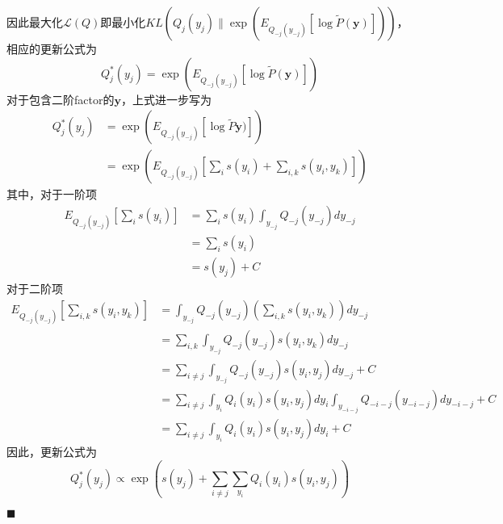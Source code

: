 因此最大化$\mathcal{L}(Q)$即最小化$KL\left(Q_j(y_j)\|\exp\left(E_{Q_{-j}(y_{-j})}\left[\log \tilde{P}(\boldsymbol{y}) \right]\right)\right)$，相应的更新公式为
\begin{equation}
  {Q^{\ast}_j(y_j)}=\exp\left(E_{Q_{-j}(y_{-j})}\left[\log \tilde{P}(\boldsymbol{y}) \right]\right)
\end{equation}
对于包含二阶factor的$\boldsymbol{y}$，上式进一步写为
\begin{equation}
  \begin{split}
    {Q^{\ast}_j(y_j)}&=\exp\left(E_{Q_{-j}(y_{-j})}\left[\log \tilde{P}\boldsymbol{y})\right]\right)\\
    &=\exp\left(E_{Q_{-j}(y_{-j})}\left[\sum_i s(y_i)+\sum_{i,k} s(y_i,y_k) \right]\right)
  \end{split}
\end{equation}
其中，对于一阶项
\begin{equation}
  \begin{split}
    E_{Q_{-j}(y_{-j})}\left[\sum_i s(y_i)\right]
    &=\sum_{i}s(y_i) \int_{y_{-j}} Q_{-j}(y_{-j}) dy_{-j}\\
    &=\sum_{i}s(y_i)\\
    &=s(y_j)+C
  \end{split}
\end{equation}
对于二阶项
\begin{equation}
  \begin{split}
    E_{Q_{-j}(y_{-j})}\left[\sum_{i,k} s(y_i,y_k) \right] &=\int_{y_{-j}} Q_{-j}(y_{-j})\left(\sum_{i,k} s(y_i,y_k) \right) dy_{-j}\\
    &=\sum_{i,k}\int_{y_{-j}} Q_{-j}(y_{-j})s(y_i,y_k) dy_{-j}\\
    &=\sum_{i\neq j}{\int_{y_{-j}}Q_{-j}(y_{-j}) s(y_i,y_j)  dy_{-j}} +C\\
    &=\sum_{i\neq j}{\int_{y_i}Q_{i}(y_i) s(y_i,y_j)  dy_i}{\int_{y_{-i-j}}Q_{{-i-j}}(y_{-i-j})   dy_{-i-j}} +C\\
    &=\sum_{i\neq j}{\int_{y_i}Q_{i}(y_i) s(y_i,y_j)  dy_i} +C
  \end{split}
\end{equation}
因此，更新公式为
\begin{equation}
  {Q^{\ast}_j(y_j)}\propto \exp\left(s(y_j) + \sum_{i\neq j}{\sum_{y_i}Q_{i}(y_i) s(y_i,y_j)} \right)
\end{equation}

\noindent$\blacksquare$
